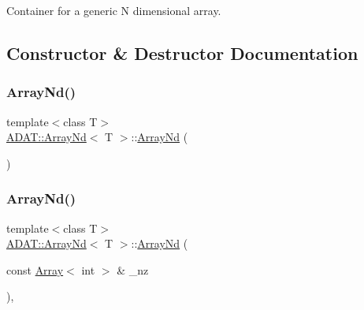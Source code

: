Container for a generic N dimensional array. 

\subsection{Constructor \& Destructor Documentation}
\mbox{\label{classADAT_1_1ArrayNd_aafdf6b588aa54b3d59b6952971bcdce4}} 
\subsubsection{\texorpdfstring{ArrayNd()}{ArrayNd()}\hspace{0.1cm}{\footnotesize\ttfamily [1/6]}}
{\footnotesize\ttfamily template$<$class T$>$ \\
\mbox{\hyperlink{classADAT_1_1ArrayNd}{A\+D\+A\+T\+::\+Array\+Nd}}$<$ T $>$\+::\mbox{\hyperlink{classADAT_1_1ArrayNd}{Array\+Nd}} (\begin{DoxyParamCaption}{ }\end{DoxyParamCaption})\hspace{0.3cm}{\ttfamily [inline]}}

\mbox{\label{classADAT_1_1ArrayNd_aea668cd9a67b06d552e4acb9a7dec98c}} 
\subsubsection{\texorpdfstring{ArrayNd()}{ArrayNd()}\hspace{0.1cm}{\footnotesize\ttfamily [2/6]}}
{\footnotesize\ttfamily template$<$class T$>$ \\
\mbox{\hyperlink{classADAT_1_1ArrayNd}{A\+D\+A\+T\+::\+Array\+Nd}}$<$ T $>$\+::\mbox{\hyperlink{classADAT_1_1ArrayNd}{Array\+Nd}} (\begin{DoxyParamCaption}\item[{const \mbox{\hyperlink{classXMLArray_1_1Array}{Array}}$<$ int $>$ \&}]{\+\_\+nz }\end{DoxyParamCaption})\hspace{0.3cm}{\ttfamily [inline]}, {\ttfamily [explicit]}}

\mbox{\label{classADAT_1_1ArrayNd_a040990cb205b2c2b5eb2f5d0594408b9}} 
